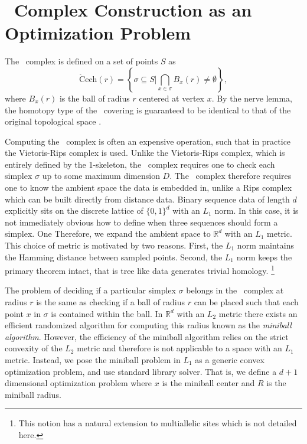 \section{\Cech\ Complex Construction as an Optimization Problem}
\label{subsec:cech_complex}
%
The \Cech\ complex is defined on a set of points $S$ as
\begin{equation}
\mathrm{\check{C}ech}(r) = \left\{\sigma \subseteq S | \bigcap_{x\in\sigma} B_x(r) \neq \emptyset \right\},
\end{equation}
where $B_x(r)$ is the ball of radius $r$ centered at vertex $x$.
By the nerve lemma, the homotopy type of the \Cech\ covering is guaranteed to be identical to that of the original topological space \citep{Borsuk:1948}.

Computing the \Cech\ complex is often an expensive operation, such that in practice the Vietoris-Rips complex is used.
Unlike the Vietoris-Rips complex, which is entirely defined by the 1-skeleton, the \Cech\ complex requires one to check each simplex $\sigma$ up to some maximum dimension $D$.
The \Cech\ complex therefore requires one to know the ambient space the data is embedded in, unlike a Rips complex which can be built directly from distance data.
Binary sequence data of length $d$ explicitly sits on the discrete lattice of $\{0,1\}^d$ with an $L_1$ norm.
In this case, it is not immediately obvious how to define when three sequences should form a simplex.
One
Therefore, we expand the ambient space to $\mathbb{R}^d$ with an $L_1$ metric.
This choice of metric is motivated by two reasons.
First, the $L_1$ norm maintains the Hamming distance between sampled points.
Second, the $L_1$ norm keeps the primary theorem intact, that is tree like data generates trivial homology.
\footnote{This notion has a natural extension to multiallelic sites which is not detailed here.}

The problem of deciding if a particular simplex $\sigma$ belongs in the \Cech\ complex at radius $r$ is the same as checking if a ball of radius $r$ can be placed such that each point $x$ in $\sigma$ is contained within the ball.
In $\mathbb{R}^d$ with an $L_2$ metric there exists an efficient randomized algorithm for computing this radius known as the \emph{miniball algorithm}.\autocite{Gartner:1999}
However, the efficiency of the miniball algorithm relies on the strict convexity of the $L_2$ metric and therefore is not applicable to a space with an $L_1$ metric.
Instead, we pose the miniball problem in $L_1$ as a generic convex optimization problem, and use standard library solver.
That is, we define a $d+1$ dimensional optimization problem where $x$ is the miniball center and $R$ is the miniball radius.

